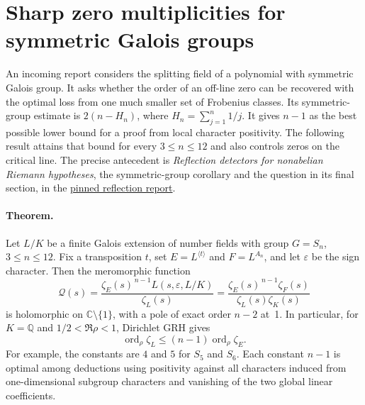 \section{Sharp zero multiplicities for symmetric Galois groups}
\label{sec:reflection}

An incoming report considers the splitting field of a polynomial with
symmetric Galois group. It asks whether the order of an off-line zero
can be recovered with the optimal loss from one much smaller set of
Frobenius classes. Its symmetric-group estimate is
$2(n-H_n)$, where $H_n=\sum_{j=1}^n1/j$.
It gives $n-1$ as the best possible lower bound for a proof from local
character positivity. The following result attains that bound for
every $3\le n\le 12$ and also controls zeros on the critical line. The precise
antecedent is \emph{Reflection detectors for nonabelian Riemann
hypotheses}, the symmetric-group corollary and the question in its final section,
in the \href{https://github.com/VladimirReshetnikov/ProveIt/blob/5cc267af75a635199ac5d93a7d49cbce521daefc/docs/incoming/grh_reflection_transfer_2026-11-25.zip}{pinned reflection report}.

\paragraph{Theorem.}
Let $L/K$ be a finite Galois extension of number fields with group
$G=S_n$, $3\le n\le 12$. Fix a transposition $t$, set
$E=L^{\langle t\rangle}$ and $F=L^{A_n}$, and let $\varepsilon$
be the sign character. Then the meromorphic function
\[
 \mathcal Q(s)=\frac{\zeta_E(s)^{\,n-1}L(s,\varepsilon,L/K)}
                         {\zeta_L(s)}
 =\frac{\zeta_E(s)^{\,n-1}\zeta_F(s)}{\zeta_L(s)\zeta_K(s)}
\]
is holomorphic on $\mathbb C\setminus\{1\}$, with a pole of exact order
$n-2$ at~1. In particular, for $K=\mathbb Q$ and $1/2<\Re\rho<1$,
Dirichlet GRH gives
\[
 \operatorname{ord}_\rho\zeta_L\le (n-1)\operatorname{ord}_\rho\zeta_E .
\]
For example, the constants are $4$ and $5$ for $S_5$ and $S_6$. Each constant $n-1$ is optimal among deductions
using positivity against all characters induced from one-dimensional
subgroup characters and vanishing of the two global linear coefficients.

